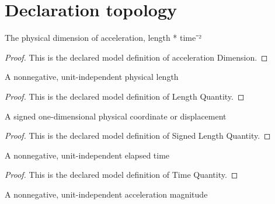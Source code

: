 \section{Declaration topology}
\begin{definition}
  \label{def:physics:phyx-mini-0743:phyxminiproblems-problemphyxmini0743-accelerationdimension}
  The physical dimension of acceleration, length * time⁻²
\end{definition}
\begin{proof}
  This is the declared model definition of acceleration Dimension.
\end{proof}
\begin{definition}
  \label{def:physics:phyx-mini-0743:phyxminiproblems-problemphyxmini0743-lengthquantity}
  A nonnegative, unit-independent physical length
\end{definition}
\begin{proof}
  This is the declared model definition of Length Quantity.
\end{proof}
\begin{definition}
  \label{def:physics:phyx-mini-0743:phyxminiproblems-problemphyxmini0743-signedlengthquantity}
  A signed one-dimensional physical coordinate or displacement
\end{definition}
\begin{proof}
  This is the declared model definition of Signed Length Quantity.
\end{proof}
\begin{definition}
  \label{def:physics:phyx-mini-0743:phyxminiproblems-problemphyxmini0743-timequantity}
  A nonnegative, unit-independent elapsed time
\end{definition}
\begin{proof}
  This is the declared model definition of Time Quantity.
\end{proof}
\begin{definition}
  \label{def:physics:phyx-mini-0743:phyxminiproblems-problemphyxmini0743-accelerationquantity}
  A nonnegative, unit-independent acceleration magnitude
\end{definition}
